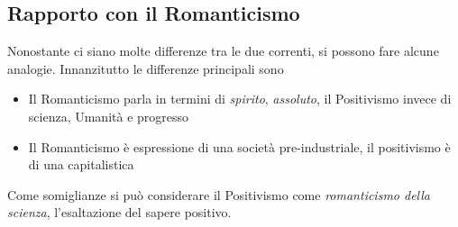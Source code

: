 \subsection{Rapporto con il Romanticismo}
Nonostante ci siano molte differenze tra le due correnti, si possono fare alcune analogie. 
Innanzitutto le differenze principali sono
\begin{itemize}
  \item Il Romanticismo parla in termini di \textit{spirito}, \textit{assoluto}, il Positivismo 
    invece di scienza, Umanità e progresso
  \item Il Romanticismo è espressione di una società pre-industriale, il positivismo è di una
    capitalistica
\end{itemize}
Come somiglianze si può considerare il Positivismo come \textit{romanticismo della scienza}, 
l'esaltazione del sapere positivo.
